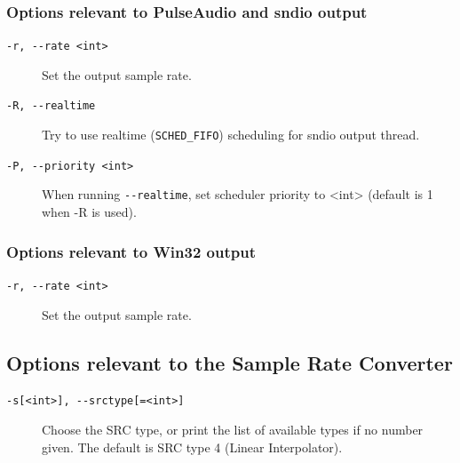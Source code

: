 \documentclass[10pt,english]{article}
\begin{document}
\subsubsection{Options relevant to PulseAudio and sndio output\label{idp401808}}

\begin{description}

\item [
\texttt{-r, {-}{-}rate <int>}
]

Set the output sample rate.

\item [
\texttt{-R, {-}{-}realtime}
]

Try to use realtime (\texttt{SCHED\_FIFO}) scheduling
for sndio output thread.

\item [
\texttt{-P, {-}{-}priority <int>}
]

When running \texttt{{-}{-}realtime}, set scheduler
priority to <int> (default is 1 when -R is used).

\end{description}



\subsubsection{Options relevant to Win32 output\label{idp407840}}

\begin{description}

\item [
\texttt{-r, {-}{-}rate <int>}
]

Set the output sample rate.

\end{description}





\subsection{Options relevant to the Sample Rate Converter\label{idp410544}}

\begin{description}

\item [
\texttt{-s[<int>], {-}{-}srctype[=<int>]}
]

Choose the SRC type, or print the list of available
types if no number given. The default is SRC type 4 (Linear
Interpolator).

\end{description}
\end{document}
